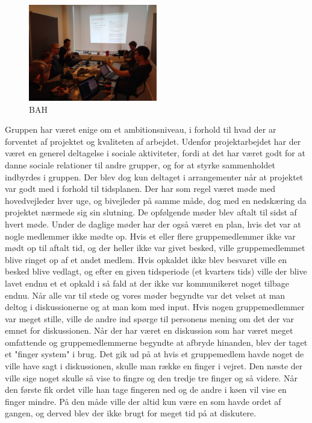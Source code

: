 \begin{figure}[ht!]
    \centering
    \includegraphics[width=0.5\textwidth]{Images/8.jpg}
    \caption{BAH}
    \label{fig:4}
\end{figure}
Gruppen har været enige om et ambitionsniveau, i forhold til hvad der ar forventet af projektet og kvaliteten af arbejdet. Udenfor projektarbejdet har der været en generel deltagelse i sociale aktiviteter, fordi at det har været godt for at danne sociale relationer til andre grupper, og for at styrke sammenholdet indbyrdes i gruppen. Der blev dog kun deltaget i arrangementer når at projektet var godt med i forhold til tidsplanen. 
Der har som regel været møde med hovedvejleder hver uge, og bivejleder på samme måde, dog med en nedskæring da projektet nærmede sig sin slutning. De opfølgende møder blev aftalt til sidst af hvert møde. Under de daglige møder har der også været en plan, hvis det var at nogle medlemmer ikke mødte op. Hvis et eller flere gruppemedlemmer ikke var mødt op til aftalt tid, og der heller ikke var givet besked, ville gruppemedlemmet blive ringet op af et andet medlem. Hvis opkaldet ikke blev besvaret ville en besked blive vedlagt, og efter en given tidsperiode (et kvarters tids) ville der blive lavet endnu et et opkald i så fald at der ikke var kommunikeret noget tilbage endnu. Når alle var til stede og vores møder begyndte var det velset at man deltog i diskussionerne og at man kom med input. Hvis nogen gruppemedlemmer var meget stille, ville de andre ind spørge til personens mening om det der var emnet for diskussionen. Når der har været en diskussion som har været meget omfattende og gruppemedlemmerne begyndte at afbryde hinanden, blev der taget et "finger system" i brug. Det gik ud på at hvis et gruppemedlem havde noget de ville have sagt i diskussionen, skulle man række en finger i vejret. Den næste der ville sige noget skulle så vise to fingre og den tredje tre finger og så videre. Når den første fik ordet ville han tage fingeren ned og de andre i køen vil vise en finger mindre. På den måde ville der altid kun være en som havde ordet af gangen, og derved blev der ikke brugt for meget tid på at diskutere.

